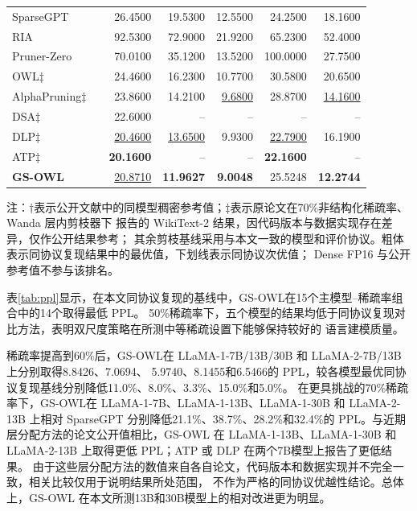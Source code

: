 \documentclass[UTF8,fontset=fandol]{ctexart}
\newcommand{\method}{GS-OWL}
\newcommand{\best}[1]{\textbf{#1}}
\newcommand{\second}[1]{\underline{#1}}
\begin{document}
\begin{table}[!htbp]
\begin{tabular*}{0.98\textwidth}{@{\extracolsep{\fill}}lcrrrrr@{}}
  SparseGPT & & 26.4500 & 19.5300 & 12.5500 & 24.2500 & 18.1600 \\
  RIA & & 92.5300 & 72.9000 & 21.9200 & 65.2300 & 52.4000 \\
  Pruner-Zero & & 70.0100 & 35.1200 & 13.5200 & 100.0000 & 27.7500 \\
  OWL$\ddagger$ & & 24.4600 & 16.2300 & 10.7700 & 30.5800 & 20.6500 \\
  AlphaPruning$\ddagger$ & & 23.8600 & 14.2100 & \second{9.6800} & 28.8700 & \second{14.1600} \\
  DSA$\ddagger$ & & 22.6000 & -- & -- & -- & -- \\
  DLP$\ddagger$ & & \second{20.4600} & \second{13.6500} & 9.9300 & \second{22.7900} & 16.1900 \\
  ATP$\ddagger$ & & \best{20.1600} & -- & -- & \best{22.1600} & -- \\
  \textbf{GS-OWL} & & \second{20.8710} & \best{11.9627} & \best{9.0048} & 25.5248 & \best{12.2744} \\
\bottomrule
\end{tabular*}
\vspace{2pt}
\parbox{0.98\textwidth}{\scriptsize
注：$\dagger$表示公开文献中的同模型稠密参考值；$\ddagger$表示原论文在70\%非结构化稀疏率、Wanda 层内剪枝器下
报告的 WikiText-2 结果\cite{owl,alphapruning,dsa,dlp,atp}，因代码版本与数据实现存在差异，仅作公开结果参考；
其余剪枝基线采用与本文一致的模型和评价协议。粗体表示同协议复现结果中的最优值，下划线表示同协议次优值；
Dense FP16 与公开参考值不参与该排名。}
\end{table}

表\ref{tab:ppl}显示，在本文同协议复现的基线中，\method 在15个主模型--稀疏率组合中的14个取得最低 PPL。
50\%稀疏率下，五个模型的结果均低于同协议复现对比方法，表明双尺度策略在所测中等稀疏设置下能够保持较好的
语言建模质量。

稀疏率提高到60\%后，\method 在 LLaMA-1-7B/13B/30B 和 LLaMA-2-7B/13B 上分别取得8.8426、7.0694、
5.9740、8.1455和6.5466的 PPL，较各模型最优同协议复现基线分别降低11.0\%、8.0\%、3.3\%、15.0\%和5.0\%。
在更具挑战的70\%稀疏率下，\method 在 LLaMA-1-7B、LLaMA-1-13B、LLaMA-1-30B 和 LLaMA-2-13B 上相对
SparseGPT 分别降低21.1\%、38.7\%、28.2\%和32.4\%的 PPL。与近期层分配方法的论文公开值相比，GS-OWL 在
LLaMA-1-13B、LLaMA-1-30B 和 LLaMA-2-13B 上取得更低 PPL；ATP 或 DLP 在两个7B模型上报告了更低结果。
由于这些层分配方法的数值来自各自论文，代码版本和数据实现并不完全一致，相关比较仅用于说明结果所处范围，
不作为严格的同协议优越性结论。总体上，GS-OWL 在本文所测13B和30B模型上的相对改进更为明显。
\end{document}
